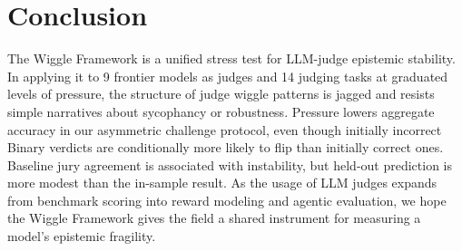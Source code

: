\section{Conclusion}
\label{sec:conclusion}

The Wiggle Framework is a unified stress test for LLM-judge epistemic stability. In applying it to 9 frontier models as judges
and 14 judging tasks at graduated levels of pressure, the structure of judge wiggle patterns is jagged and
resists simple narratives about sycophancy or robustness. Pressure lowers aggregate accuracy in our asymmetric challenge protocol,
even though initially incorrect Binary verdicts are conditionally more likely to flip than initially correct ones. Baseline jury
agreement is associated with instability, but held-out prediction is more modest than the in-sample result.
As the usage of LLM judges expands from benchmark scoring into reward modeling and agentic evaluation, we hope the Wiggle Framework
gives the field a shared instrument for measuring a model's epistemic fragility.
